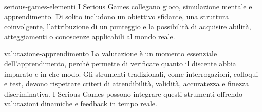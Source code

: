 \documentclass[preview]{standalone}
\begin{document}
\begin{snippet}{serious-games-elementi}
    I Serious Games collegano gioco, simulazione mentale e apprendimento. Di
    solito includono un obiettivo sfidante, una struttura coinvolgente,
    l'attribuzione di un punteggio e la possibilità di acquisire abilità,
    atteggiamenti o conoscenze applicabili al mondo reale.
\end{snippet}


\begin{snippet}{valutazione-apprendimento}
    La valutazione è un momento essenziale dell'apprendimento, perché permette
    di verificare quanto il discente abbia imparato e in che modo. Gli strumenti
    tradizionali, come interrogazioni, colloqui e test, devono rispettare criteri
    di attendibilità, validità, accuratezza e finezza discriminativa. I Serious
    Games possono integrare questi strumenti offrendo valutazioni dinamiche e
    feedback in tempo reale.
\end{snippet}
\end{document}
